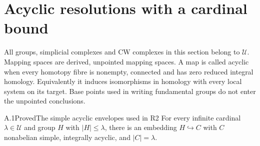 \section{Acyclic resolutions with a cardinal bound}
\label{sec:A}

All groups, simplicial complexes and CW complexes in this section belong to
$\mathcal U$. Mapping spaces are derived, unpointed mapping spaces. A map
is called acyclic when every homotopy fibre is nonempty, connected and has
zero reduced integral homology. Equivalently it induces isomorphisms in
homology with every local system on its target. Base points used in writing
fundamental groups do not enter the unpointed conclusions.

\begin{claim}{A.1}{Proved}{The simple acyclic envelopes used in R2}
For every infinite cardinal $\lambda\in\mathcal U$ and group $H$ with
$|H|\leq\lambda$, there is an embedding $H\hookrightarrow C$ with $C$
nonabelian simple, integrally acyclic, and $|C|=\lambda$.
\end{claim}
